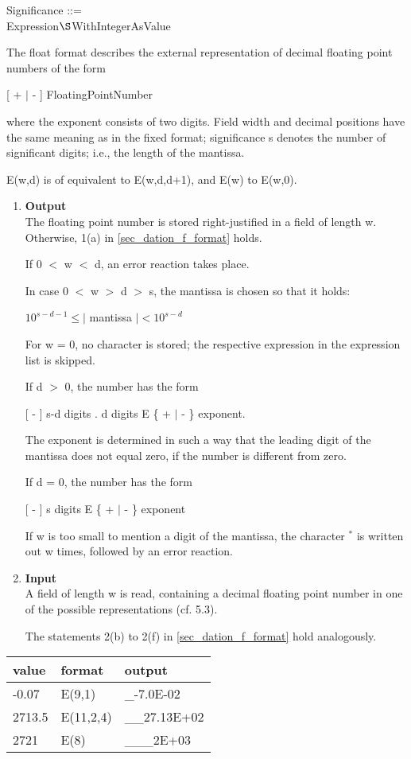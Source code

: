 Significance ::= \\
\x Expression$\S $WithIntegerAsValue

The float format describes the external representation of decimal
floating point numbers of the form

[ + $\mid$ - ] FloatingPointNumber

where the exponent consists of two  digits.
 Field width and decimal
positions have the same meaning as in the fixed format; significance s
denotes the number of significant digits; i.e., the length of the
mantissa.

E(w,d) is of equivalent to E(w,d,d+1), and E(w) to E(w,0).

\begin{removed}
\begin{enumerate}
\item {\bf Output}\\
The floating point number is stored right-justified in a field of length
w. Otherwise, 1(a) in \ref{sec_dation_f_format} holds.

If 0 $<$ w $<$ d, an error reaction takes place.

In case 0 $<$ w $>$ d $>$ s, the mantissa is chosen so that it holds:

\hspace*{1cm}$10^{s-d-1} \leq \mid$ mantissa $\mid < 10^{s-d}$

For w = 0, no character is stored; the respective expression in the
expression list is skipped.

If d $>$ 0, the number has the form

\hspace*{1cm}[ - ] s-d digits . d digits E \{ + $\mid$ - \} exponent.

The exponent is determined in such a way that the leading digit of the
mantissa does not equal zero, if the number is different from zero.

If d = 0, the number has the form

\hspace*{1cm}[ - ] s digits E \{ + $\mid$ - \} exponent

If w is too small to mention a digit of the mantissa, the character $^*$
is written out w times, followed by an error reaction.
\item {\bf Input}\\
A field of length w is read, containing a decimal floating point number
in one of the possible representations (cf. 5.3).

The statements 2(b) to 2(f) in \ref{sec_dation_f_format} hold analogously.
\end{enumerate}

\begin{tabular}{lll}
value  & format    & output \\ \hline
-0.07  & E(9,1)    & \_-7.0E-02 \\
2713.5 & E(11,2,4) & \_\_27.13E+02 \\
2721   & E(8)      & \_\_\_2E+03
\end{tabular}
\end{removed}

